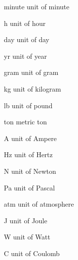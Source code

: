 \begin{datadesc}{minute}
unit of minute
\end{datadesc}

\begin{datadesc}{h}
unit of hour
\end{datadesc}

\begin{datadesc}{day}
unit of day
\end{datadesc}

\begin{datadesc}{yr}
unit of year
\end{datadesc}

\begin{datadesc}{gram}
unit of gram
\end{datadesc}

\begin{datadesc}{kg}
unit of kilogram
\end{datadesc}

\begin{datadesc}{lb}
unit of pound
\end{datadesc}

\begin{datadesc}{ton}
metric ton
\end{datadesc}

\begin{datadesc}{A}
unit of Ampere
\end{datadesc}

\begin{datadesc}{Hz}
unit of Hertz
\end{datadesc}

\begin{datadesc}{N}
unit of Newton
\end{datadesc}

\begin{datadesc}{Pa}
unit of Pascal
\end{datadesc}

\begin{datadesc}{atm}
unit of atmosphere
\end{datadesc}

\begin{datadesc}{J}
unit of Joule
\end{datadesc}

\begin{datadesc}{W}
unit of Watt
\end{datadesc}

\begin{datadesc}{C}
unit of Coulomb
\end{datadesc}

